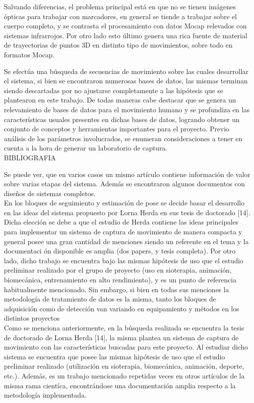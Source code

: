 Salvando diferencias, el problema principal está en que no se tienen imágenes
ópticas para trabajar con marcadores, en general se tiende a trabajar sobre el
cuerpo completo, y se contrasta el procesamiento con datos Mocap relevados con
sistemas infrarrojos. Por otro lado esto último genera una rica fuente de material de
trayectorias de puntos 3D en distinto tipo de movimientos, sobre todo en formatos
Mocap.

Se efectúa una búsqueda de secuencias de movimiento sobre las cuales desarrollar el sistema, si bien se encontraron numerosas bases de datos, las mismas terminan siendo descartadas por no ajustarse completamente  a las hipótesis que se plantearon en este trabajo. De todas maneras cabe destacar que se genera un relevamiento de bases de datos para el movimiento humano y se profundiza en las características usuales presentes en dichas bases de datos, logrando obtener un conjunto de conceptos y herramientas importantes para el proyecto. Previo análisis de los parámetros involucrados, se enumeran consideraciones a tener en cuenta a la hora de generar un laboratorio de captura.\\
 
 
BIBLIOGRAFIA

Se puede ver, que en varios casos un mismo artículo contiene información de
valor sobre varias etapas del sistema. Además se encontraron algunos documentos
con diseños de sistemas completos.\\

En los bloques de seguimiento y estimación de pose se decide basar el desarrollo en las ideas del sistema propuesto por Lorna Herda en sus tesis de doctorado [14]. Dicha elección se debe a que el estudio de Herda contiene las ideas principales para implementar un sistema de captura de movimiento de manera compacta y general
posee una gran cantidad de menciones siendo un referente en el tema y la documentaci
ón disponible es amplia (dos papers, y tesis completa). Por otro lado, dicho
trabajo se encuentra bajo las mismas hipótesis de uso que el estudio preliminar
realizado por el grupo de proyecto (uso en sioterapia, animación, biomecánica,
entrenamiento en alto rendimiento), y es un punto de referencia habitualmente
mencionado. Sin embargo, si bien en todas sus menciones la metodología de tratamiento
de datos es la misma, tanto los bloques de adquisición como de detección
van variando en equipamiento y métodos en los distintos proyectos\\

Como se menciona anteriormente, en la búsqueda realizada se encuentra la
tesis de doctorado de Lorna Herda [14], la misma plantea un sistema de captura
de movimiento con las características buscadas para este proyecto. Al estudiar
dicho sistema se encuentra que posee las mismas hipótesis de uso que el estudio
preliminar realizado (utilización en sioterapia, biomecánica, animación, deporte,
etc.). Además, es un trabajo mencionado repetidas veces en otros artículos de la
misma rama cientíca, encontrándose una documentación amplia respecto a la
metodología implementada.

